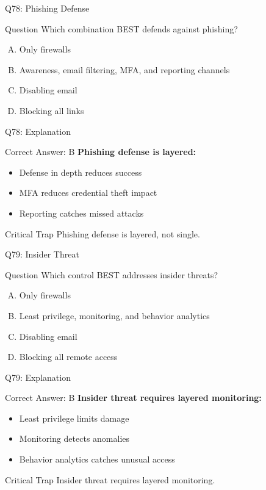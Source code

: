 \documentclass{beamer}
\begin{document}
	\begin{frame}{Q78: Phishing Defense}
		\begin{block}{Question}
			Which combination BEST defends against phishing?
		\end{block}
		\begin{enumerate}[(A)]
			\item Only firewalls
			\item Awareness, email filtering, MFA, and reporting channels
			\item Disabling email
			\item Blocking all links
		\end{enumerate}
	\end{frame}
	
	\begin{frame}{Q78: Explanation}
		\begin{block}{Correct Answer: B}
			\textbf{Phishing defense is layered:}
			\begin{itemize}
				\item Defense in depth reduces success
				\item MFA reduces credential theft impact
				\item Reporting catches missed attacks
			\end{itemize}
		\end{block}
		\begin{alertblock}{Critical Trap}
			Phishing defense is layered, not single.
		\end{alertblock}
	\end{frame}
	
	\begin{frame}{Q79: Insider Threat}
		\begin{block}{Question}
			Which control BEST addresses insider threats?
		\end{block}
		\begin{enumerate}[(A)]
			\item Only firewalls
			\item Least privilege, monitoring, and behavior analytics
			\item Disabling email
			\item Blocking all remote access
		\end{enumerate}
	\end{frame}
	
	\begin{frame}{Q79: Explanation}
		\begin{block}{Correct Answer: B}
			\textbf{Insider threat requires layered monitoring:}
			\begin{itemize}
				\item Least privilege limits damage
				\item Monitoring detects anomalies
				\item Behavior analytics catches unusual access
			\end{itemize}
		\end{block}
		\begin{alertblock}{Critical Trap}
			Insider threat requires layered monitoring.
		\end{alertblock}
	\end{frame}
	
\end{document}
